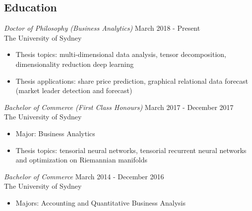 \documentclass[margin, 11pt]{res} %
\begin{document}
\begin{resume}



\section{Education}
{\sl Doctor of Philosophy (Business Analytics)} \hfill March 2018 - Present\\
The University of Sydney
\begin{itemize}
    \item Thesis topics: multi-dimensional data analysis, tensor decomposition, dimensionality reduction deep learning
    \item Thesis applications: share price prediction, graphical relational data forecast (market leader detection and forecast)
\end{itemize}

{\sl Bachelor of Commerce (First Class Honours)} \hfill March 2017 - December 2017\\
The University of Sydney
\begin{itemize}
\item Major: Business Analytics
\item Thesis topics: tensorial neural networks, tensorial recurrent neural networks and optimization on Riemannian manifolds
\end{itemize}


{\sl Bachelor of Commerce} \hfill March 2014 - December 2016\\
The University of Sydney
\begin{itemize}
\item Majors: Accounting and Quantitative Business Analysis
\end{itemize} 


\end{resume}
\end{document}
